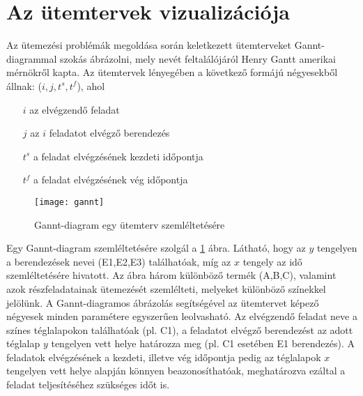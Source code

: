 \section{Az ütemtervek vizualizációja}
Az ütemezési problémák megoldása során keletkezett ütemterveket Gannt-diagrammal szokás ábrázolni, mely nevét feltalálójáról Henry Gantt amerikai mérnökről kapta. \cite{0879600489}
Az ütemtervek lényegében a következő formájú négyesekből állnak: ($i,j,t^s,t^f$), ahol
\begin{itemize}
\item[$i$] az elvégzendő feladat
\item[$j$] az $i$ feladatot elvégző berendezés
\item[$t^s$] a feladat elvégzésének kezdeti időpontja
\item[$t^f$] a feladat elvégzésének vég időpontja
\end{itemize}
\begin{figure}[H]
\begin{center}
\texttt{[image: gannt]}
\caption{Gannt-diagram egy ütemterv szemléltetésére}
\label{gannt}
\end{center}
\end{figure}
Egy Gannt-diagram szemléltetésére szolgál a \ref{gannt} ábra.
Látható, hogy az $y$ tengelyen a berendezések nevei (E1,E2,E3) találhatóak, míg az $x$ tengely az idő szemléltetésére hivatott.
Az ábra három különböző termék (A,B,C), valamint azok részfeladatainak ütemezését szemlélteti, melyeket különböző színekkel jelölünk.
A Gannt-diagramos ábrázolás segítségével az ütemtervet képező négyesek minden paramétere egyszerűen leolvasható.
Az elvégzendő feladat neve a színes téglalapokon találhatóak (pl. C1), a feladatot elvégző berendezést az adott téglalap $y$ tengelyen vett helye határozza meg (pl. C1 esetében E1 berendezés).
A feladatok elvégzésének a kezdeti, illetve vég időpontja pedig az téglalapok $x$ tengelyen vett helye alapján könnyen beazonosíthatóak, meghatározva ezáltal a feladat teljesítéséhez szükséges időt is. 